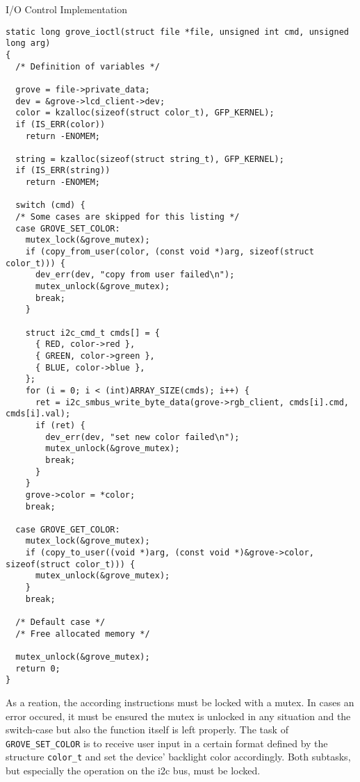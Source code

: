 \begin{listing} [H]
    \caption{I/O Control Implementation}
    \label{lst:ioctl}
    \begin{verbatim}
static long grove_ioctl(struct file *file, unsigned int cmd, unsigned long arg)
{
  /* Definition of variables */

  grove = file->private_data;
  dev = &grove->lcd_client->dev;
  color = kzalloc(sizeof(struct color_t), GFP_KERNEL);
  if (IS_ERR(color))
    return -ENOMEM;

  string = kzalloc(sizeof(struct string_t), GFP_KERNEL);
  if (IS_ERR(string))
    return -ENOMEM;

  switch (cmd) {
  /* Some cases are skipped for this listing */
  case GROVE_SET_COLOR:
    mutex_lock(&grove_mutex);
    if (copy_from_user(color, (const void *)arg, sizeof(struct color_t))) {
      dev_err(dev, "copy from user failed\n");
      mutex_unlock(&grove_mutex);
      break;
    }

    struct i2c_cmd_t cmds[] = {
      { RED, color->red },
      { GREEN, color->green },
      { BLUE, color->blue },
    };
    for (i = 0; i < (int)ARRAY_SIZE(cmds); i++) {
      ret = i2c_smbus_write_byte_data(grove->rgb_client, cmds[i].cmd, cmds[i].val);
      if (ret) {
        dev_err(dev, "set new color failed\n");
        mutex_unlock(&grove_mutex);
        break;
      }
    }   
    grove->color = *color;
    break;

  case GROVE_GET_COLOR:
    mutex_lock(&grove_mutex);
    if (copy_to_user((void *)arg, (const void *)&grove->color, sizeof(struct color_t))) {
      mutex_unlock(&grove_mutex);
    }
    break;

  /* Default case */ 
  /* Free allocated memory */

  mutex_unlock(&grove_mutex);
  return 0;
}
    \end{verbatim}
\end{listing}
%
As a reation, the according instructions must be locked with a mutex.
In cases an error occured, it must be ensured the mutex is unlocked in any situation and the switch-case but also the function itself is left properly.
The task of \texttt{GROVE_SET_COLOR} is to receive user input in a certain format defined by the structure \texttt{color_t} and set the device' backlight color accordingly.
Both subtasks, but especially the operation on the \ac{i2c} bus, must be locked.

